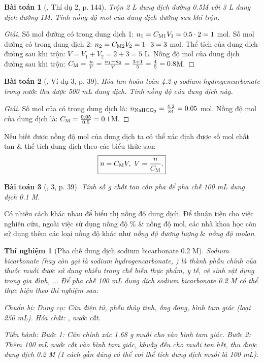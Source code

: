 \documentclass{article}
\newtheorem{baitoan}{Bài toán}
\newtheorem{thinghiem}{Thí nghiệm}
\begin{document}
\begin{baitoan}[\cite{SGK_Hoa_Hoc_8}, Thí dụ 2, p. 144]
	Trộn \emph{2 L} dung dịch đường \emph{0.5M} với \emph{3 L} dung dịch đường \emph{1M}. Tính nồng độ mol của dung dịch đường sau khi trộn.
\end{baitoan}

\begin{proof}[Giải]
	Số mol đường có trong dung dịch 1: $n_1 = C_{\rm M1}V_1 = 0.5\cdot2 = 1$ mol. Số mol đường có trong dung dịch 2: $n_2 = C_{\rm M2}V_2 = 1\cdot3 = 3$ mol. Thể tích của dung dịch đường sau khi trộn: $V = V_1 + V_2 = 2 + 3 = 5$ L. Nồng độ mol của dung dịch đường sau khi trộn: $C_{\rm M} = \frac{n}{V} = \frac{n_1 + n_2}{V} = \frac{3 + 1}{5} = \frac{4}{5} = 0.8$M.
\end{proof}

\begin{baitoan}[\cite{SGK_KHTN_8_Canh_Dieu}, Ví dụ 3, p. 39]
	Hòa tan hoàn toàn \emph{4.2 g} sodium hydrogencarbonate \emph{} trong nước thu được \emph{500 mL} dung dịch. Tính nồng độ của dung dịch này.
\end{baitoan}

\begin{proof}[Giải]
	Số mol của  có trong dung dịch là: $n_{\rm NaHCO_3} = \frac{4.2}{84} = 0.05$ mol. Nồng độ mol của dung dịch  là: $C_{\rm M} = \frac{0.05}{0.5} = 0.1$M.
\end{proof}
Nếu biết được nồng độ mol của dung dịch ta có thể xác định được số mol chất tan \& thể tích dung dịch theo các biểu thức sau:
\begin{align*}
	\boxed{n =C_{\rm M}V,\ V = \frac{n}{C_{\rm M}}.}
\end{align*}

\begin{baitoan}[\cite{SGK_KHTN_8_Canh_Dieu}, 3, p. 39]
	Tính số \emph{g} chất tan cần pha để pha chế \emph{100 mL} dung dịch \emph{ 0.1 M}.
\end{baitoan}
Có nhiều cách khác nhau để biểu thị nồng độ dung dịch. Để thuận tiện cho việc nghiên cứu, ngoài việc sử dụng nồng độ \% \& nồng độ mol, các nhà khoa học còn sử dụng thêm các loại nồng độ khác như \textit{nồng độ đương lượng} \& \textit{nồng độ molan}.

\begin{thinghiem}[Pha chế dung dịch sodium bicarbonate 0.2 M]
	Sodium bicarbonate (hay còn gọi là sodium hydrogencarbonate, ) là thành phần chính của thuốc muối được sử dụng nhiều trong chế biến thực phẩm, y tế, vệ sinh vật dụng trong gia đình, $\ldots$ Để pha chế 100 mL dung dịch sodium bicarbonate 0.2 M có thể thực hiện theo thí nghiệm sau:
	
	\emph{Chuẩn bị:} Dụng cụ: Cân điện tử, phễu thủy tinh, ống đong, bình tam giác (loại \emph{250 mL}). Hóa chất: \emph{}, nước cất.
	
	\emph{Tiến hành:} Bước 1: Cân chính xác \emph{1.68 g} muối \emph{} cho vào bình tam giác. Bước 2: Thêm \emph{100 mL} nước cất vào bình tam giác, khuấy đều cho muối tan hết, thu được dung dịch \emph{ 0.2 M} (1 cách gần đúng có thể coi thể tích dung dịch muối  là \emph{100 mL}).
\end{thinghiem}
\end{document}
